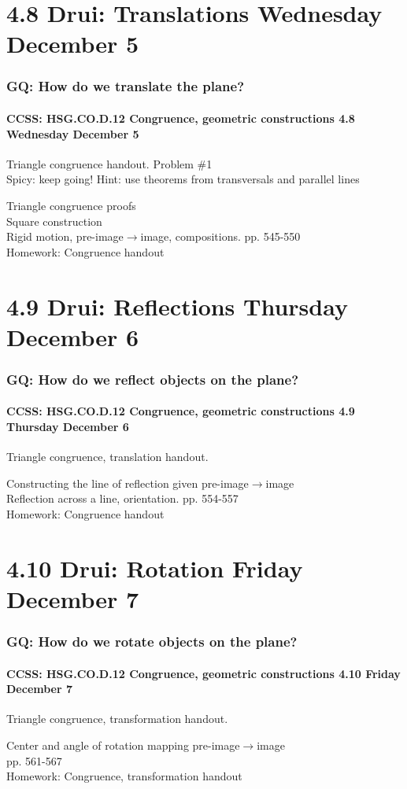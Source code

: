 \documentclass{beamer}
\begin{document}
  \section{4.8 Drui: Translations Wednesday December 5}
    \frame
    {
      \frametitle{GQ: How do we translate the plane?}
      \framesubtitle{CCSS: HSG.CO.D.12 Congruence, geometric constructions  \alert{4.8 Wednesday December 5}}

      \begin{block}{Triangle congruence handout. Problem \#1 \\ Spicy: keep going!}
        Hint: use theorems from transversals and parallel lines
      \end{block} \vspace{0.5cm}
      Triangle congruence proofs\\
      Square construction\\
      Rigid motion, pre-image$\rightarrow$image, compositions. pp. 545-550\\[0.5cm]
      Homework: Congruence handout
    }

  \section{4.9 Drui: Reflections Thursday December 6}
    \frame
    {
      \frametitle{GQ: How do we reflect objects on the plane?}
      \framesubtitle{CCSS: HSG.CO.D.12 Congruence, geometric constructions  \alert{4.9 Thursday December 6}}

      \begin{block}{Triangle congruence, translation handout.}
      \end{block} \vspace{0.5cm}
      Constructing the line of reflection given pre-image$\rightarrow$image\\
      Reflection across a line, orientation. pp. 554-557\\[0.5cm]
      Homework: Congruence handout
    }

  \section{4.10 Drui: Rotation Friday December 7}
    \frame
    {
      \frametitle{GQ: How do we rotate objects on the plane?}
      \framesubtitle{CCSS: HSG.CO.D.12 Congruence, geometric constructions  \alert{4.10 Friday December 7}}

      \begin{block}{Triangle congruence, transformation handout.}
      \end{block} \vspace{0.5cm}
      Center and angle of rotation mapping pre-image$\rightarrow$image\\
      pp. 561-567\\[0.5cm]
      Homework: Congruence, transformation handout
    }
\end{document}
